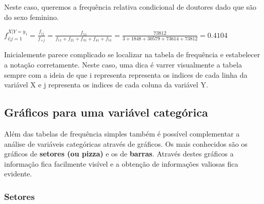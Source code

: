 \documentclass[11pt,]{style/krantz}
\renewenvironment{quote}{\begin{VF}}{\end{VF}}
\theoremstyle{definition}
\theoremstyle{definition}
\theoremstyle{definition}
\theoremstyle{remark}
\begin{document}
Neste caso, queremos a frequência relativa condicional de doutores dado que são do sexo feminino.

\(f_{i|j=1}^{X|Y=y_1} = \frac{f_{ij}}{f_{+j}} = \frac{f_{51}}{f_{11}+f_{21}+f_{31}+f_{41}+f_{51}}=\frac{73812}{3+1848+30579+73614+73812}=0.4104\)

\begin{quote}
Inicialemente parece complicado se localizar na tabela de frequência e estabelecer a notação corretamente. Neste caso, uma dica é varrer visualmente a tabela sempre com a ideia de que i representa representa os indices de cada linha da variável X e j representa os indices de cada coluna da variável Y.
\end{quote}

\hypertarget{graficos-para-uma-variavel-categorica}{%
\subsection{Gráficos para uma variável categórica}\label{graficos-para-uma-variavel-categorica}}

Além das tabelas de frequência simples também é possível complementar a análise de variáveis categóricas através de gráficos. Os mais conhecidos são os gráficos de \textbf{setores (ou pizza)} e os de \textbf{barras}. Através destes gráficos a informação fica facilmente visível e a obtenção de informações valiosas fica evidente.

\hypertarget{setores}{%
\subsubsection{Setores}\label{setores}}
\end{document}
